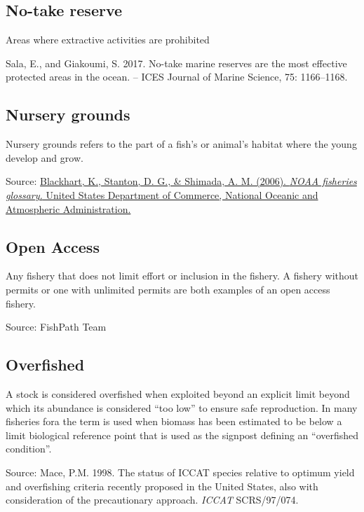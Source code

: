 \documentclass[
  11pt,
]{book}
\begin{document}
\hypertarget{no-take-reserve}{%
\subsection{No-take reserve}\label{no-take-reserve}}

Areas where extractive activities are prohibited

Sala, E., and Giakoumi, S. 2017. No-take marine reserves are the most effective protected areas in the ocean. -- ICES Journal of Marine Science, 75: 1166--1168.

\hypertarget{nursery-grounds}{%
\subsection{Nursery grounds}\label{nursery-grounds}}

Nursery grounds refers to the part of a fish's or animal's habitat where the young develop and grow.

Source: \href{https://repository.library.noaa.gov/view/noaa/12856}{Blackhart, K., Stanton, D. G., \& Shimada, A. M. (2006). \emph{NOAA fisheries glossary.} United States Department of Commerce, National Oceanic and Atmospheric Administration.}

\hypertarget{open-access}{%
\subsection{Open Access}\label{open-access}}

Any fishery that does not limit effort or inclusion in the fishery. A fishery without permits or one with unlimited permits are both examples of an open access fishery.

Source: FishPath Team

\hypertarget{overfished}{%
\subsection{Overfished}\label{overfished}}

A stock is considered overfished when exploited beyond an explicit limit beyond which its abundance is considered ``too low'' to ensure safe reproduction. In many fisheries fora the term is used when biomass has been estimated to be below a limit biological reference point that is used as the signpost defining an ``overfished condition''.

Source: Mace, P.M. 1998. The status of ICCAT species relative to optimum yield and overfishing criteria recently proposed in the United States, also with consideration of the precautionary approach. \emph{ICCAT} SCRS/97/074.
\end{document}
